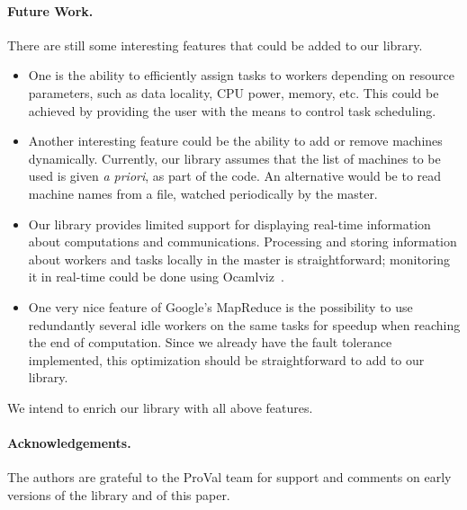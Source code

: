 \documentclass[a4paper,12pt]{article}
\begin{document}
\paragraph{Future Work.}
There are still some interesting features that could be added to our
library. 
\begin{itemize}
\item 
  One is the ability to efficiently assign tasks to workers depending
  on resource parameters, such as data locality, CPU power, memory,
  etc. This could be achieved by providing the user with the means to control
  task scheduling.  
\item 
  Another interesting feature could be the ability
  to add or remove machines dynamically. Currently, our library assumes
  that the list of machines to be used is given \emph{a priori}, as
  part of the code. An alternative would be to read machine names from
  a file, watched periodically by the master.
\item
  Our library provides limited support for displaying real-time
  information about computations and communications. Processing and storing
  information about workers and tasks locally in the master is straightforward; 
  monitoring it in real-time could be done using
  \textsf{Ocamlviz}~\cite{ocamlviz}. 
\item 
  One very nice feature of Google's MapReduce is the possibility to
  use redundantly several idle workers on the same tasks
  for speedup when reaching the end of computation.
  Since we already have the fault tolerance implemented, this
  optimization should be straightforward to add to our library.
\end{itemize}
We intend to enrich our library with all above features.



\paragraph{Acknowledgements.}
The authors are grateful to the ProVal team for support and comments
on early versions of the library and of this paper.



\end{document}
